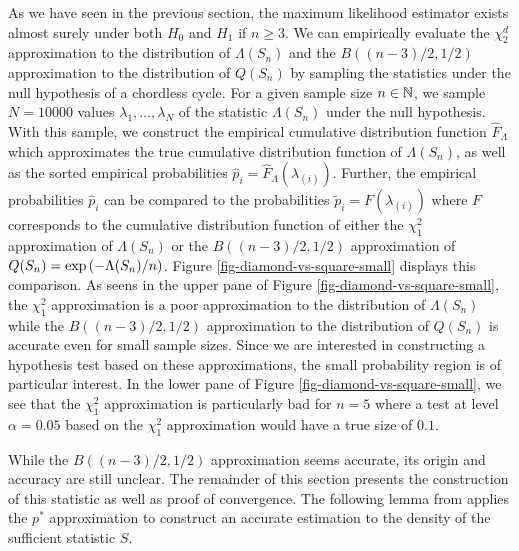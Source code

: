 As we have seen in the previous section, the maximum likelihood estimator exists almost surely under both $H_0$ and $H_1$ if $n \geq 3$. We can empirically evaluate the $\chi_2^d$ approximation to the distribution of $\Lambda(S_n)$ and the $B((n - 3)/2, 1/2)$ approximation to the distribution of $Q(S_n)$ by sampling the statistics under the null hypothesis of a chordless cycle. For a given sample size $n \in \mathbb{N}$, we sample $N = 10000$ values $\lambda_1, \ldots, \lambda_N$ of the statistic $\Lambda(S_n)$ under the null hypothesis. With this sample, we construct the empirical cumulative distribution function $\hat F_\Lambda$ which approximates the true cumulative distribution function of $\Lambda(S_n)$, as well as the sorted empirical probabilities $\hat p_{i} = \hat F_\Lambda(\lambda_{(i)})$. Further, the empirical probabilities $\hat p_{i}$ can be compared to the probabilities $\tilde p_i = F(\lambda_{(i)})$ where $F$ corresponds to the cumulative distribution function of either the $\chi^2_1$ approximation of $\Lambda(S_n)$ or the $B((n - 3)/2, 1/2)$ approximation of $Q(S_n) = \exp\left(-\Lambda(S_n) / n\right)$. Figure \ref{fig-diamond-vs-square-small} displays this comparison. As seens in the upper pane of Figure \ref{fig-diamond-vs-square-small}, the $\chi^2_1$ approximation is a poor approximation to the distribution of $\Lambda(S_n)$ while the $B((n - 3)/2, 1/2)$ approximation to the distribution of $Q(S_n)$ is accurate even for small sample sizes. Since we are interested in constructing a hypothesis test based on these approximations, the small probability region is of particular interest. In the lower pane of Figure \ref{fig-diamond-vs-square-small}, we see that the $\chi^2_1$ approximation is particularly bad for $n=5$ where a test at level $\alpha=0.05$ based on the $\chi^2_1$ approximation would have a true size of $0.1$.



While the $B((n - 3)/2, 1/2)$ approximation seems accurate, its origin and accuracy are still unclear. The remainder of this section presents the construction of this statistic as well as proof of convergence. The following lemma from \cite[Theorem 3.1]{eriksen1996tests} applies the $p^*$ approximation to construct an accurate estimation to the density of the sufficient statistic $S$.

